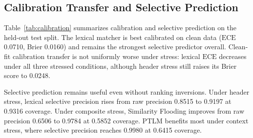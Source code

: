 \documentclass{article}
\newcommand{\ece}{\mbox{$\mathrm{ECE}$}}
\begin{document}
\subsection{Calibration Transfer and Selective Prediction}

Table~\ref{tab:calibration} summarizes calibration and selective prediction on the held-out test split. The lexical matcher is best calibrated on clean data (\ece{} 0.0710, Brier 0.0160) and remains the strongest selective predictor overall. Clean-fit calibration transfer is not uniformly worse under stress: lexical \ece{} decreases under all three stressed conditions, although header stress still raises its Brier score to 0.0248.

Selective prediction remains useful even without ranking inversions. Under header stress, lexical selective precision rises from raw precision 0.8515 to 0.9197 at 0.9316 coverage. Under composite stress, Similarity Flooding improves from raw precision 0.6506 to 0.9784 at 0.5852 coverage. PTLM benefits most under context stress, where selective precision reaches 0.9980 at 0.6415 coverage.
\end{document}
